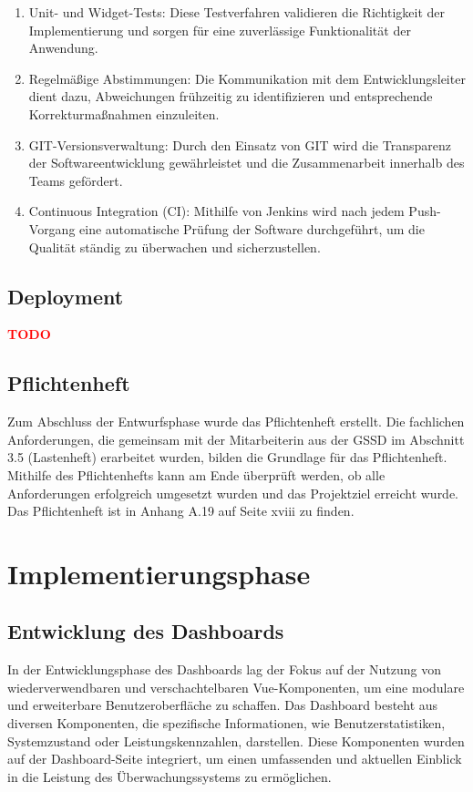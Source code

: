 \begin{flushleft}
\begin{enumerate}
\item Unit- und Widget-Tests: Diese Testverfahren validieren die Richtigkeit der Implementierung und sorgen für eine zuverlässige Funktionalität der Anwendung.
\item Regelmäßige Abstimmungen: Die Kommunikation mit dem Entwicklungsleiter dient dazu, Abweichungen frühzeitig zu identifizieren und entsprechende Korrekturmaßnahmen einzuleiten.
\item GIT-Versionsverwaltung: Durch den Einsatz von GIT wird die Transparenz der Softwareentwicklung gewährleistet und die Zusammenarbeit innerhalb des Teams gefördert.
\item Continuous Integration (CI): Mithilfe von Jenkins wird nach jedem Push-Vorgang eine automatische Prüfung der Software durchgeführt, um die Qualität ständig zu überwachen und sicherzustellen.
\end{enumerate}


\subsection{Deployment}
\textcolor{red}{\textbf{TODO}}\\
\subsection{Pflichtenheft}
Zum Abschluss der Entwurfsphase wurde das Pflichtenheft erstellt. Die fachlichen Anforderungen, die gemeinsam mit der Mitarbeiterin aus der \acs{GSSD} im Abschnitt 3.5 (Lastenheft) erarbeitet wurden, bilden die Grundlage für das Pflichtenheft. Mithilfe des Pflichtenhefts kann am Ende überprüft werden, ob alle Anforderungen erfolgreich umgesetzt wurden und das Projektziel erreicht wurde. Das Pflichtenheft ist in Anhang A.19 auf Seite xviii zu finden.

\section{Implementierungsphase}


\subsection{Entwicklung des Dashboards}
In der Entwicklungsphase des Dashboards lag der Fokus auf der Nutzung von wiederverwendbaren und verschachtelbaren Vue-Komponenten, um eine modulare und erweiterbare Benutzeroberfläche zu schaffen. Das Dashboard besteht aus diversen Komponenten, die spezifische Informationen, wie Benutzerstatistiken, Systemzustand oder Leistungskennzahlen, darstellen. Diese Komponenten wurden auf der Dashboard-Seite integriert, um einen umfassenden und aktuellen Einblick in die Leistung des Überwachungssystems zu ermöglichen.


\end{flushleft}
